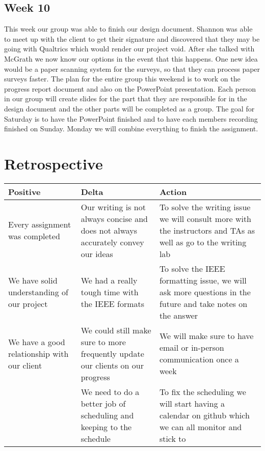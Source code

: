 \documentclass[letterpaper,10pt,serif, draftclsnofoot,onecolumn, compsoc, titlepage]{IEEEtran}
\begin{document}
\subsection{Week 10}
This week our group was able to finish our design document. Shannon was able to meet up with the client to get their signature and discovered that they may be going with Qualtrics which would render our project void. After she talked with McGrath we now know our options in the event that this happens. One new idea would be a paper scanning system for the surveys, so that they can process paper surveys faster. The plan for the entire group this weekend is to work on the progress report document and also on the PowerPoint presentation. Each person in our group will create slides for the part that they are responsible for in the design document and the other parts will be completed as a group. The goal for Saturday is to have the PowerPoint finished and to have each members recording finished on Sunday. Monday we will combine everything to finish the assignment. 

\section{Retrospective}
\begin{center}
    \begin{tabular}{ | p{5cm} | p{5cm} | p{5cm} |}
    \hline
     Positive & Delta & Action \\ \hline
  	Every assignment was completed & Our writing is not always concise and does not always accurately convey our ideas & To solve the writing issue we will consult more with the instructors and TAs as well as go to the writing lab \\\hline
	We have solid understanding of our project & We had a really tough time with the IEEE formats & To solve the IEEE formatting issue, we will ask more questions in the future and take notes on the answer \\ \hline
	We have a good relationship with our client & We could still make sure to more frequently update our clients on our progress & We will make sure to have email or in-person communication once a week \\ \hline
	&We need to do a better job of scheduling and keeping to the schedule& To fix the scheduling we will start having a calendar on github which we can all monitor and stick to \\ \hline
    \end{tabular}
\end{center}
\end{document}
